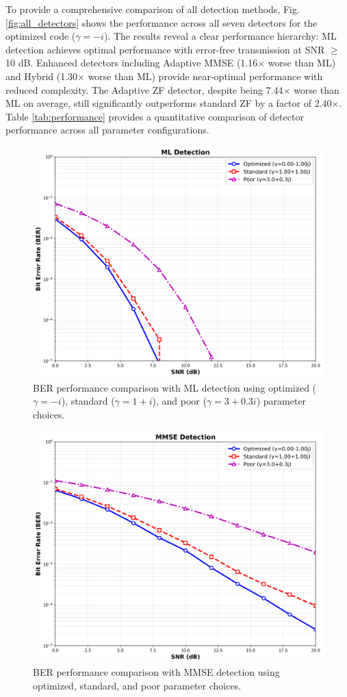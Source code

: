 To provide a comprehensive comparison of all detection methods, Fig. \ref{fig:all_detectors} shows the performance across all seven detectors for the optimized code (\(\gamma = -i\)). The results reveal a clear performance hierarchy: ML detection achieves optimal performance with error-free transmission at SNR $\geq$ 10 dB. Enhanced detectors including Adaptive MMSE (1.16$\times$ worse than ML) and Hybrid (1.30$\times$ worse than ML) provide near-optimal performance with reduced complexity. The Adaptive ZF detector, despite being 7.44$\times$ worse than ML on average, still significantly outperforms standard ZF by a factor of 2.40$\times$. Table \ref{tab:performance} provides a quantitative comparison of detector performance across all parameter configurations.

\begin{figure}[!t]
\centering
\includegraphics[width=0.9\columnwidth]{figures/ml_detection.png} 
\caption{BER performance comparison with ML detection using optimized (\(\gamma = -i\)), standard (\(\gamma = 1+i\)), and poor (\(\gamma = 3+0.3i\)) parameter choices.}
\label{fig:ml_plot}
\end{figure}

\begin{figure}[!t]
\centering
\includegraphics[width=0.9\columnwidth]{figures/mmse_detection.png} 
\caption{BER performance comparison with MMSE detection using optimized, standard, and poor parameter choices.}
\label{fig:mmse_plot}
\end{figure}

